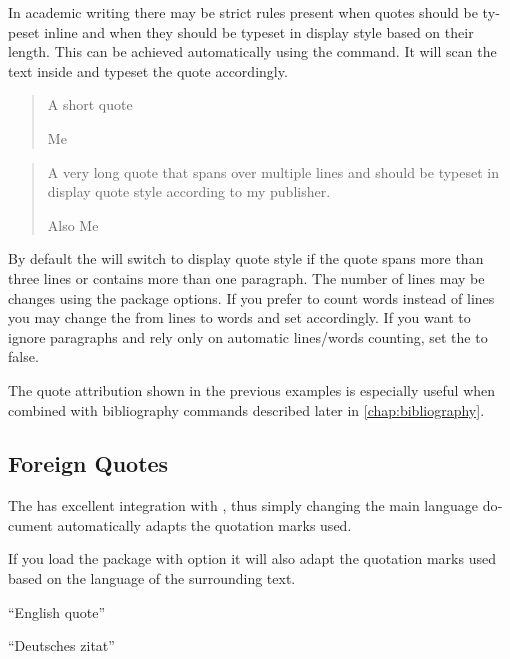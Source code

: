 In academic writing there may be strict rules present when quotes should be
typeset inline and when they should be typeset in display style based on their
length. This can be achieved automatically using the  command.
It will scan the text inside and typeset the quote accordingly.
\begin{example}[examplewidth=0.5\textwidth]
\csdisplaytrue%
\blockquote[Me]{A short quote}

\blockquote[Also Me]{A very long
  quote that spans over multiple
  lines and should be typeset in
  display quote style
  according to my publisher.}
\end{example}
By default the  will switch to display quote style if the quote
spans more than three lines or contains more than one paragraph. The number of
lines may be changes using the  package options. If you prefer
to count words instead of lines you may change the  from
lines to words and set  accordingly. If you want to ignore
paragraphs and rely only on automatic lines\slash{}words counting, set the
 to false.

The quote attribution shown in the previous examples is especially useful when
combined with bibliography commands described later in
\autoref{chap:bibliography}.

\subsection{Foreign Quotes}

The  has excellent integration with , thus
simply changing the main language document automatically adapts the quotation
marks used.
\begin{example}
\setmainlanguage{french}

\end{example}

If you load the package with  option it will also adapt the
quotation marks used based on the language of the surrounding text.
\begin{example}
\usepackage[autostyle]{csquotes}

\enquote{English quote}

\begin{german}
  \enquote{Deutsches zitat}
\end{german}
\end{example}

